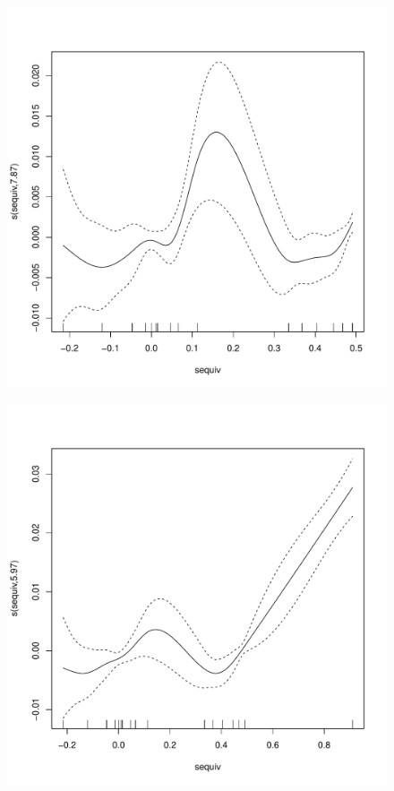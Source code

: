 \documentclass[12pt,letterpaper]{article}
\begin{document}
	\begin{figure}[ht]
		\centering
		\begin{minipage}{.5\textwidth}
			\centering
			\includegraphics[width = \linewidth]{figures/no_can_gam.pdf}
			\label{fig:test1}
		\end{minipage}%
		\begin{minipage}{.5\textwidth}
			\centering
			\includegraphics[width= \linewidth]{figures/can_gam.pdf}
			\label{fig:test2}
		\end{minipage}
	\end{figure}
	
\end{document}
